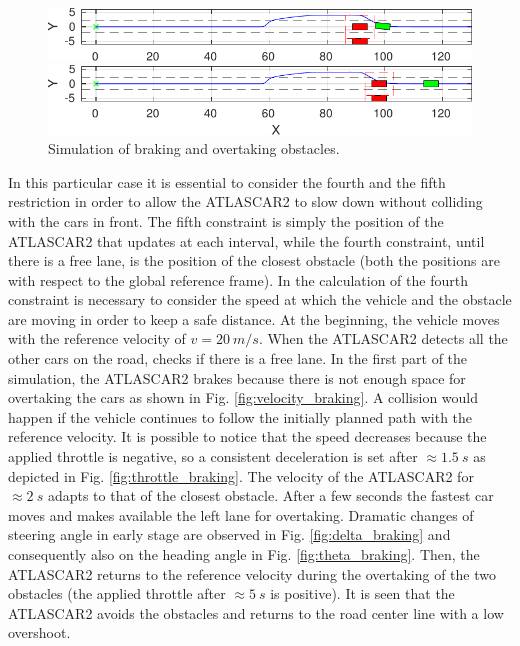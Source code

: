 \begin{figure}[!h]
\begin{minipage}[t]{\textwidth}
	\end{minipage}
	\begin{minipage}[t]{\textwidth}
		\includegraphics[width=\textwidth]{./figure/three_obstacles_no_overtaking/braking_5.pdf}
	\end{minipage}
	\begin{minipage}[t]{\textwidth}
		\includegraphics[width=\textwidth]{./figure/three_obstacles_no_overtaking/braking_6.pdf}
	\end{minipage}
	\caption{Simulation of braking and overtaking obstacles.}
	\label{fig:braking}
\end{figure}

In this particular case it is essential to consider the fourth and the fifth restriction in order to allow the ATLASCAR2 to slow down without colliding with the cars in front. The fifth constraint is simply the position of the ATLASCAR2 that updates at each interval, while the fourth constraint, until there is a free lane, is the position of the closest obstacle (both the positions are with respect to the global reference frame). In the calculation of the fourth constraint is necessary  to consider the speed at which the vehicle and the obstacle are moving in order to keep a safe distance.
At the beginning, the vehicle moves with the reference velocity of $v=\SI{20}{m/s}$. When the ATLASCAR2 detects all the other cars on the road, checks if there is a free lane. In the first part of the simulation, the ATLASCAR2 brakes because there is not enough space for overtaking the cars as shown in Fig. \ref{fig:velocity_braking}. A collision would happen if the vehicle continues to follow the initially planned path with the reference velocity. It is possible to notice that the speed decreases because the applied throttle is negative, so a consistent deceleration is set after $\approx\SI{1.5}{s}$ as depicted in Fig. \ref{fig:throttle_braking}. The velocity of the ATLASCAR2 for $\approx\SI{2}{s}$ adapts to that of the closest obstacle. After a few seconds the fastest car moves and makes available the left lane for overtaking. Dramatic changes of steering angle in early stage are observed in Fig. \ref{fig:delta_braking} and consequently also on the heading angle in Fig. \ref{fig:theta_braking}. Then, the ATLASCAR2 returns to the reference velocity during the overtaking of the two obstacles (the applied throttle after $\approx\SI{5}{s}$ is positive). It is seen that the ATLASCAR2 avoids the obstacles and returns to the road center line with a low overshoot.

